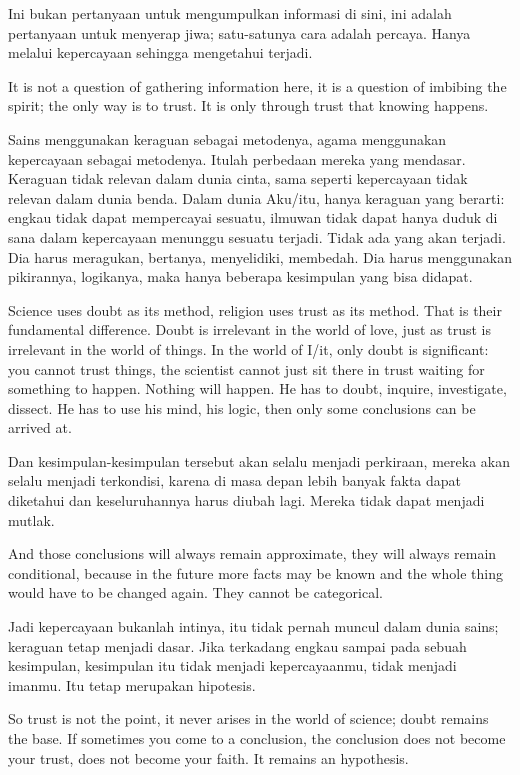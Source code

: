 \bahasa
Ini bukan pertanyaan untuk mengumpulkan informasi di sini, ini adalah pertanyaan untuk menyerap jiwa; satu-satunya cara adalah percaya. Hanya melalui kepercayaan sehingga mengetahui terjadi.

\english
It is not a question of gathering information here, it is a question of imbibing the spirit; the only way is to trust. It is only through trust that knowing happens.

\bahasa
Sains menggunakan keraguan sebagai metodenya, agama menggunakan kepercayaan sebagai metodenya. Itulah perbedaan mereka yang mendasar. Keraguan tidak relevan dalam dunia cinta, sama seperti kepercayaan tidak relevan dalam dunia benda. Dalam dunia Aku/itu, hanya keraguan yang berarti: engkau tidak dapat mempercayai sesuatu, ilmuwan tidak dapat hanya duduk di sana dalam kepercayaan menunggu sesuatu terjadi. Tidak ada yang akan terjadi. Dia harus meragukan, bertanya, menyelidiki, membedah. Dia harus menggunakan pikirannya, logikanya, maka hanya beberapa kesimpulan yang bisa didapat.

\english
Science uses doubt as its method, religion uses trust as its method. That is their fundamental difference. Doubt is irrelevant in the world of love, just as trust is irrelevant in the world of things. In the world of I/it, only doubt is significant: you cannot trust things, the scientist cannot just sit there in trust waiting for something to happen. Nothing will happen. He has to doubt, inquire, investigate, dissect. He has to use his mind, his logic, then only some conclusions can be arrived at.

\bahasa
Dan kesimpulan-kesimpulan tersebut akan selalu menjadi perkiraan, mereka akan selalu menjadi terkondisi, karena di masa depan lebih banyak fakta dapat diketahui dan keseluruhannya harus diubah lagi. Mereka tidak dapat menjadi mutlak.

\english
And those conclusions will always remain approximate, they will always remain
conditional, because in the future more facts may be known and the whole thing would have to be changed again. They cannot be categorical.

\bahasa
Jadi kepercayaan bukanlah intinya, itu tidak pernah muncul dalam dunia sains; keraguan tetap menjadi dasar. Jika terkadang engkau sampai pada sebuah kesimpulan, kesimpulan itu tidak menjadi kepercayaanmu, tidak menjadi imanmu. Itu tetap merupakan hipotesis.

\english
So trust is not the point, it never arises in the world of science; doubt remains the base. If sometimes you come to a conclusion, the conclusion does not become your trust, does not become your faith. It remains an hypothesis.

